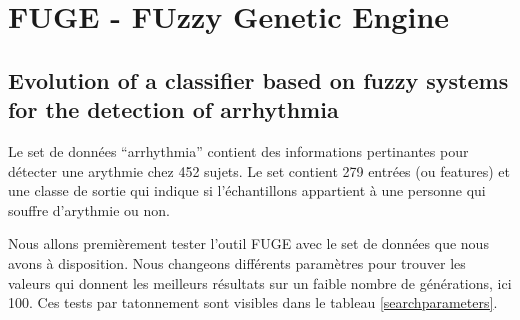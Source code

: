 \chapter*{FUGE - FUzzy Genetic Engine}
\section*{Evolution of a classifier based on fuzzy systems for the detection of arrhythmia}

Le set de données ``arrhythmia'' contient des informations pertinantes pour détecter une arythmie chez 452 sujets. Le set contient 279 entrées (ou features) et une classe de sortie qui indique si l'échantillons appartient à une personne qui souffre d'arythmie ou non.

Nous allons premièrement tester l'outil FUGE avec le set de données que nous avons à disposition. Nous changeons différents paramètres pour trouver les valeurs qui donnent les meilleurs résultats sur un faible nombre de générations, ici 100. Ces tests par tatonnement sont visibles dans le tableau \ref{searchparameters}.

